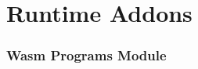 \documentclass[../alan-handbook.tex]{subfiles}
\begin{document}
\section{Runtime Addons} \label{RuntimeAddons}

\subsubsection{Wasm Programs Module} \label{ProgramsModule}
\end{document}
